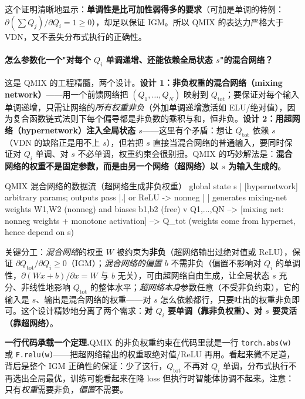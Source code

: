 这个证明清晰地显示：\textbf{单调性是比可加性弱得多的要求}（可加是单调的特例：$\partial(\sum Q_j)/\partial Q_i=1\ge0$），却足以保证 IGM。所以 QMIX 的表达力严格大于 VDN，又不丢失分布式执行的正确性。

\paragraph{怎么参数化一个"对每个 $Q_i$ 单调递增、还能依赖全局状态 $s$"的混合网络？} 这是 QMIX 的工程精髓，两个设计。\textbf{设计 1：非负权重的混合网络（mixing network）}——用一个前馈网络把 $(Q_1,\dots,Q_N)$ 映射到 $Q_{\text{tot}}$；要保证对每个输入单调递增，只需让网络的\emph{所有权重非负}（外加单调递增激活如 ELU/绝对值），因为复合函数链式法则下每个偏导都是非负数的乘积与和，恒非负。\textbf{设计 2：用超网络（hypernetwork）注入全局状态 $s$}——这里有个矛盾：想让 $Q_{\text{tot}}$ 依赖 $s$（VDN 的缺陷正是用不上 $s$），但若把 $s$ 直接当混合网络的普通输入，要同时保证对 $Q_i$ 单调、对 $s$ 不必单调，权重约束会很别扭。QMIX 的巧妙解法是：\textbf{混合网络的权重不是固定参数，而是由另一个网络（超网络）以 $s$ 为输入生成的}。

\begin{codebox}[text]{QMIX 混合网络的数据流（超网络生成非负权重）}
   global state s
       |
   [hypernetwork]    arbitrary params; outputs pass |.| or ReLU -> nonneg
       |
       | generates mixing-net weights W1,W2 (nonneg) and biases b1,b2 (free)
       v
Q1,...,QN --> [mixing net: nonneg weights + monotone activation] --> Q_tot
              (weights come from hypernet, hence depend on s)
\end{codebox}

关键分工：\emph{混合网络}的权重 $W$ 被约束为\textbf{非负}（超网络输出过绝对值或 ReLU），保证 $\partial Q_{\text{tot}}/\partial Q_i\ge0$（IGM）；\emph{混合网络的偏置 $b$} 不需非负（偏置不影响对 $Q_i$ 的单调性，$\partial(Wx+b)/\partial x=W$ 与 $b$ 无关），可由超网络自由生成，让全局状态 $s$ 充分、非线性地影响 $Q_{\text{tot}}$ 的整体水平；\emph{超网络本身}参数任意（不受非负约束），它的输入是 $s$、输出是混合网络的权重——对 $s$ 怎么依赖都行，只要吐出的权重非负即可。这个设计精妙地分离了两个需求：\textbf{对 $Q_i$ 要单调（靠非负权重）、对 $s$ 要灵活（靠超网络）}。

\begin{note}
\textbf{一行代码承载一个定理.}\;QMIX 的非负权重约束在代码里就是一行 \texttt{torch.\allowbreak abs(w)} 或 \texttt{F.relu(w)}——把超网络输出的权重取绝对值/ReLU 再用。看起来微不足道，背后是整个 IGM 正确性的保证：少了这行，$Q_{\text{tot}}$ 不再对 $Q_i$ 单调，分布式执行不再选出全局最优，训练可能看起来在降 loss 但执行时智能体协调不起来。注意：只有\emph{权重}需要非负，\emph{偏置}不需要。
\end{note}


